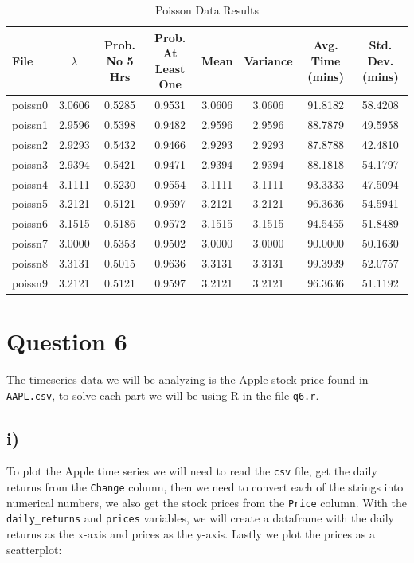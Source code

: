 \documentclass[11pt, letterpaper]{article}
\begin{document}
\begin{table}[h]
	\centering
	\small
	\begin{tabular}{|l|c|c|c|c|c|c|c|}
		\hline
		File    & $\lambda$ & Prob. No 5 Hrs   & Prob. At Least One &
		Mean    & Variance  & Avg. Time (mins) & Std. Dev. (mins)
		\\
		\hline
		poissn0 & 3.0606    & 0.5285           & 0.9531             &
		3.0606  & 3.0606    & 91.8182
		        & 58.4208
		\\
		poissn1 & 2.9596    & 0.5398           & 0.9482             &
		2.9596  & 2.9596    & 88.7879
		        & 49.5958
		\\
		poissn2 & 2.9293    & 0.5432           & 0.9466             &
		2.9293  & 2.9293    & 87.8788
		        & 42.4810
		\\
		poissn3 & 2.9394    & 0.5421           & 0.9471             &
		2.9394  & 2.9394    & 88.1818
		        & 54.1797
		\\
		poissn4 & 3.1111    & 0.5230           & 0.9554             &
		3.1111  & 3.1111    & 93.3333
		        & 47.5094
		\\
		poissn5 & 3.2121    & 0.5121           & 0.9597             &
		3.2121  & 3.2121    & 96.3636
		        & 54.5941
		\\
		poissn6 & 3.1515    & 0.5186           & 0.9572             &
		3.1515  & 3.1515    & 94.5455
		        & 51.8489
		\\
		poissn7 & 3.0000    & 0.5353           & 0.9502             &
		3.0000  & 3.0000    & 90.0000
		        & 50.1630
		\\
		poissn8 & 3.3131    & 0.5015           & 0.9636             &
		3.3131  & 3.3131    & 99.3939
		        & 52.0757
		\\
		poissn9 & 3.2121    & 0.5121           & 0.9597             &
		3.2121  & 3.2121    & 96.3636
		        & 51.1192
		\\
		\hline
	\end{tabular}
	\caption{Poisson Data Results}
\end{table}
\newpage
\section*{Question 6}
The timeseries data we will be analyzing is the Apple stock price found in
\verb|AAPL.csv|, to solve each
part we will be using R in the file \verb|q6.r|.
\subsection*{i)}
To plot the Apple time series we will need to read the \verb|csv| file, get the
daily returns from the \verb|Change| column,
then we need to convert each of the strings into numerical numbers, we also get
the stock prices from the \verb|Price| column.
With the \verb|daily_returns| and \verb|prices| variables, we will create a
dataframe with the daily returns as the x-axis
and prices as the y-axis. Lastly we plot the prices as a scatterplot:
\end{document}
